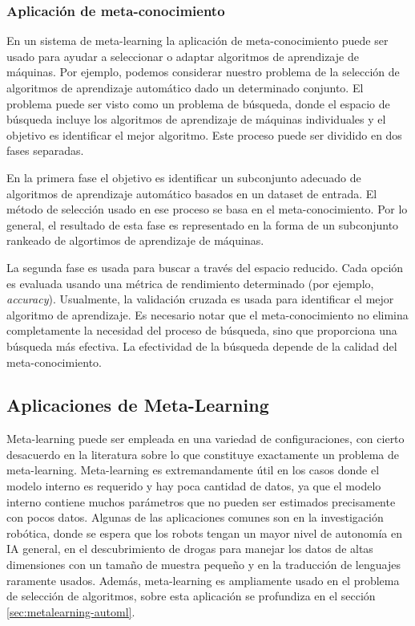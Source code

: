 \subsubsection{Aplicación de meta-conocimiento}

En un sistema de meta-learning la aplicación de meta-conocimiento puede ser usado para ayudar a seleccionar o adaptar algoritmos de aprendizaje de máquinas. Por ejemplo, podemos considerar nuestro problema de la selección de algoritmos de aprendizaje automático dado un determinado conjunto. El problema puede ser visto como un problema de búsqueda, donde el espacio de búsqueda incluye los algoritmos de aprendizaje de máquinas individuales y el objetivo es identificar el mejor algoritmo. Este proceso puede ser dividido en dos fases separadas. 

En la primera fase el objetivo es identificar un subconjunto adecuado de algoritmos de aprendizaje automático basados en un dataset de entrada. El método de selección usado en ese proceso se basa en el meta-conocimiento. Por lo general, el resultado de esta fase es representado en la forma de un subconjunto rankeado de algortimos de aprendizaje de máquinas.

La segunda fase es usada para buscar a través del espacio reducido. Cada opción es evaluada usando una métrica de rendimiento determinado (por ejemplo, \textit{accuracy}). Usualmente, la validación cruzada es usada para identificar el mejor algoritmo de aprendizaje. Es necesario notar que el meta-conocimiento no elimina completamente la necesidad del proceso de búsqueda, sino que proporciona una búsqueda más efectiva. La efectividad de la búsqueda depende de la calidad del meta-conocimiento.


\subsection{Aplicaciones de Meta-Learning}\label{subsec:mtl_aplications}

Meta-learning puede ser empleada en una variedad de configuraciones, con cierto desacuerdo en la literatura sobre lo que constituye exactamente un problema de meta-learning. Meta-learning es extremandamente útil en los casos donde el modelo interno es requerido y hay poca cantidad de datos, ya que el modelo interno contiene muchos parámetros que no pueden ser estimados precisamente con pocos datos. Algunas de las aplicaciones comunes son en la investigación robótica, donde se espera que los robots tengan un mayor nivel de autonomía en IA general, en el descubrimiento de drogas para manejar los datos de altas dimensiones con un tamaño de muestra pequeño y en la traducción de lenguajes raramente usados. Además, meta-learning es ampliamente usado en el problema de selección de algoritmos, sobre esta aplicación se profundiza en el sección \ref{sec:metalearning-automl}.

